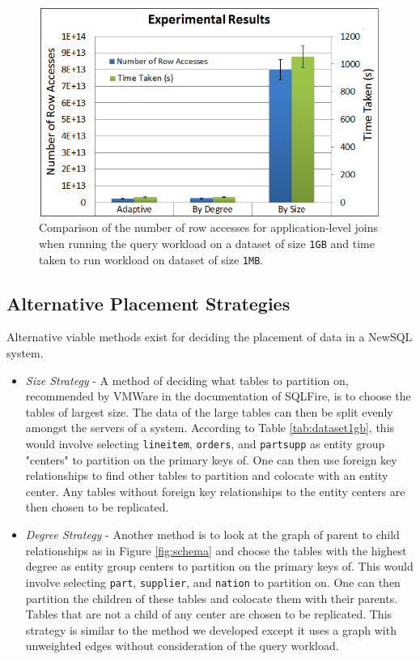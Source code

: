 \begin{figure}
\centering
\includegraphics[width=1\columnwidth]{combined-accesses.png}
\caption{\footnotesize{Comparison of the number of row accesses for application-level joins when running the query workload on a dataset of size \texttt{1GB} and time taken to run workload on dataset of size \texttt{1MB}.}}
\label{fig:combined-accesses}
\end{figure}

\subsection{Alternative Placement Strategies}
Alternative viable methods exist for deciding the placement of data in a NewSQL system.  

\begin{itemize}
\vspace*{-9pt}
  \item \emph{Size Strategy} - A method of deciding what tables to partition on, recommended by VMWare in the documentation of SQLFire, is to choose the tables of largest size.  The data of the large tables can then be split evenly amongst the servers of a system.  According to Table \ref{tab:dataset1gb}, this would involve selecting \texttt{lineitem}, \texttt{orders}, and \texttt{partsupp} as entity group "centers" to partition on the primary keys of.  One can then use foreign key relationships to find other tables to partition and colocate with an entity center.  Any tables without foreign key relationships to the entity centers are then chosen to be replicated.
\vspace*{-18pt}
  \item \emph{Degree Strategy} - Another method is to look at the graph of parent to child relationships as in Figure \ref{fig:schema} and choose the tables with the highest degree as entity group centers to partition on the primary keys of.  This would involve selecting \texttt{part}, \texttt{supplier}, and \texttt{nation} to partition on.  One can then partition the children of these tables and colocate them with their parents.  Tables that are not a child of any center are chosen to be replicated.  This strategy is similar to the method we developed except it uses a graph with unweighted edges without consideration of the query workload.
\end{itemize}

